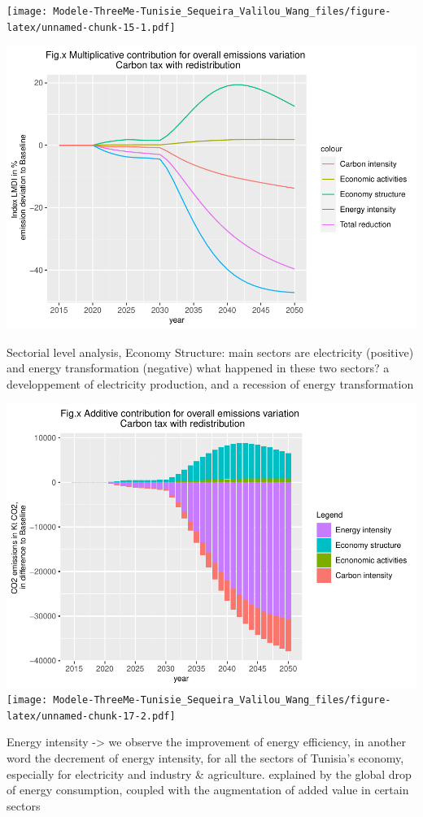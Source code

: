 \documentclass[
]{article}
\begin{document}
\texttt{[image: Modele-ThreeMe-Tunisie\_Sequeira\_Valilou\_Wang\_files/figure-latex/unnamed-chunk-15-1.pdf]}

\includegraphics{Modele-ThreeMe-Tunisie_Sequeira_Valilou_Wang_files/figure-latex/unnamed-chunk-16-1.pdf}

Sectorial level analysis, Economy Structure: main sectors are
electricity (positive) and energy transformation (negative) what
happened in these two sectors? a developpement of electricity
production, and a recession of energy transformation

\includegraphics{Modele-ThreeMe-Tunisie_Sequeira_Valilou_Wang_files/figure-latex/unnamed-chunk-17-1.pdf}
\texttt{[image: Modele-ThreeMe-Tunisie\_Sequeira\_Valilou\_Wang\_files/figure-latex/unnamed-chunk-17-2.pdf]}

Energy intensity -\textgreater{} we observe the improvement of energy
efficiency, in another word the decrement of energy intensity, for all
the sectors of Tunisia's economy, especially for electricity and
industry \& agriculture. explained by the global drop of energy
consumption, coupled with the augmentation of added value in certain
sectors
\end{document}
